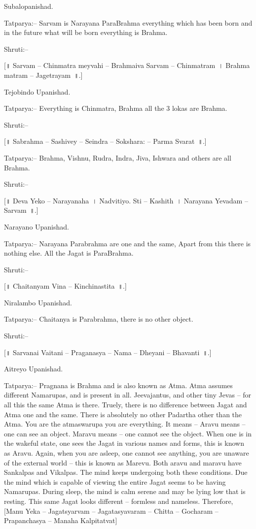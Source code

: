 Subalopanishad.

Tatparya:– Sarvam is Narayana ParaBrahma everything which has been born and in the future what will be born everything is Brahma.

Shruti:–

[॥ Sarvam – Chinmatra meyvahi – Brahmaiva Sarvam – Chinmatram~। Brahma matram – Jagetrayam~॥.]

Tejobindo Upanishad.

Tatparya:– Everything is Chinmatra, Brahma all the 3 lokas are Brahma.

Shruti:–

[॥ Sabrahma – Sashivey – Seindra – Sokshara: – Parma Svarat~॥.]

Tatparya:– Brahma, Vishnu, Rudra, Indra, Jiva, Ishwara and others are all Brahma.

Shruti:–

[॥ Deva Yeko – Narayanaha~। Nadvitiyo. Sti – Kashith~। Narayana Yevadam – Sarvam~॥.]

Narayano Upanishad.

Tatparya:– Narayana Parabrahma are one and the same, Apart from this there is nothing else. All the Jagat is ParaBrahma.

Shruti:–

[॥ Chaitanyam Vina – Kinchinastita~॥.]

Niralambo Upanishad.

Tatparya:– Chaitanya is Parabrahma, there is no other object.

Shruti:–

[॥ Sarvanai Vaitani – Praganasya – Nama – Dheyani – Bhavanti~॥.]

Aitreyo Upanishad.

Tatparya:– Pragnana is Brahma and is also known as Atma. Atma assumes different Namarupas, and is present in all. Jeevajantus, and other tiny Jevas – for all this the same Atma is there. Truely, there is no difference between Jagat and Atma one and the same. There is absolutely no other Padartha other than the Atma. You are the atmaswarupa you are everything. It means – Aravu means – one can see an object. Maravu means – one cannot see the object. When one is in the wakeful state, one sees the Jagat in various names and forms, this is known as Aravu. Again, when you are asleep, one cannot see anything, you are unaware of the external world – this is known as Marevu. Both aravu and maravu have Sankalpas and Vikalpas. The mind keeps undergoing both these conditions. Due the mind which is capable of viewing the entire Jagat seems to be having Namarupas. During sleep, the mind is calm serene and may be lying low that is resting. This same Jagat looks different – formless and nameless. Therefore, [Manu Yeka – Jagatsyarvam – Jagatasyavaram – Chitta – Gocharam – Prapanchasya – Manaha Kalpitatvat]


